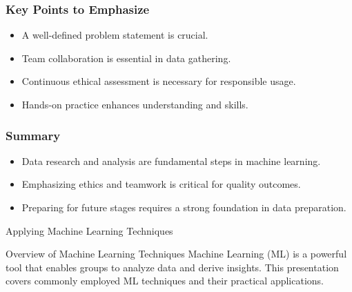 \documentclass[aspectratio=169]{beamer}
\begin{document}
\begin{frame}[fragile]
    \frametitle{Key Points to Emphasize}
    \begin{itemize}
        \item A well-defined problem statement is crucial.
        \item Team collaboration is essential in data gathering.
        \item Continuous ethical assessment is necessary for responsible usage.
        \item Hands-on practice enhances understanding and skills.
    \end{itemize}
\end{frame}

\begin{frame}[fragile]
    \frametitle{Summary}
    \begin{itemize}
        \item Data research and analysis are fundamental steps in machine learning.
        \item Emphasizing ethics and teamwork is critical for quality outcomes.
        \item Preparing for future stages requires a strong foundation in data preparation.
    \end{itemize}
\end{frame}

\begin{frame}{Applying Machine Learning Techniques}
  \begin{block}{Overview of Machine Learning Techniques}
    Machine Learning (ML) is a powerful tool that enables groups to analyze data and derive insights. This presentation covers commonly employed ML techniques and their practical applications.
  \end{block}
\end{frame}
\end{document}
